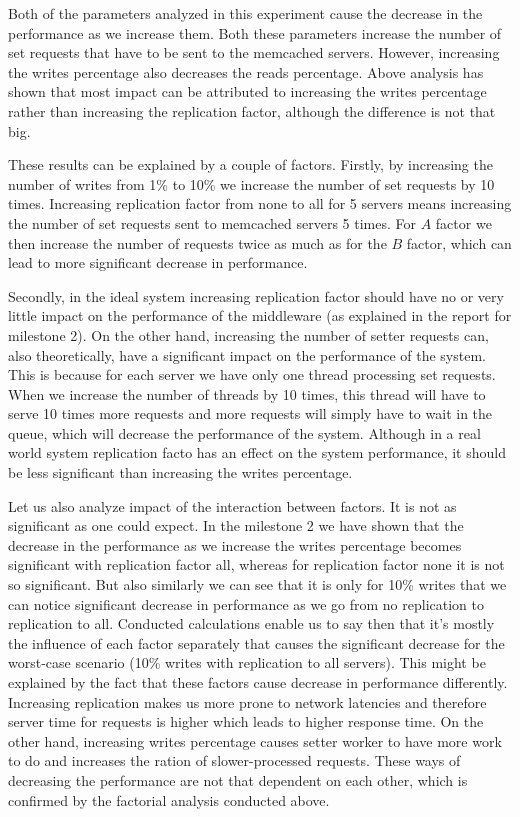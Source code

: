 \documentclass[11pt]{article}
\begin{document}
Both of the parameters analyzed in this experiment cause the decrease in the performance as we increase them. Both these parameters increase the number of set requests that have to be sent to the memcached servers. However, increasing the writes percentage also decreases the reads percentage. Above analysis has shown that most impact can be attributed to increasing the writes percentage rather than increasing the replication factor, although the difference is not that big.

These results can be explained by a couple of factors. Firstly, by increasing the number of writes from 1\% to 10\% we increase the number of set requests by 10 times. Increasing replication factor from none to all for 5 servers means increasing the number of set requests sent to memcached servers 5 times. For $A$ factor we then increase the number of requests twice as much as for the $B$ factor, which can lead to more significant decrease in performance.

Secondly, in the ideal system increasing replication factor should have no or very little impact on the performance of the middleware (as explained in the report for milestone 2). On the other hand, increasing the number of setter requests can, also theoretically, have a significant impact on the performance of the system. This is because for each server we have only one thread processing set requests. When we increase the number of threads by 10 times, this thread will have to serve 10 times more requests and more requests will simply have to wait in the queue, which will decrease the performance of the system. Although in a real world system replication facto has an effect on the system performance, it should be less significant than increasing the writes percentage. 

Let us also analyze impact of the interaction between factors. It is not as significant as one could expect. In the milestone 2 we have shown that the decrease in the performance as we increase the writes percentage becomes significant with replication factor all, whereas for replication factor none it is not so significant. But also similarly we can see that it is only for 10\% writes that we can notice significant decrease in performance as we go from no replication to replication to all. Conducted calculations enable us to say then that it's mostly the influence of each factor separately that causes the significant decrease for the worst-case scenario (10\% writes with replication to all servers). This might be explained by the fact that these factors cause decrease in performance differently. Increasing replication makes us more prone to network latencies and therefore server time for requests is higher which leads to higher response time. On the other hand, increasing writes percentage causes setter worker to have more work to do and increases the ration of slower-processed requests. These ways of decreasing the performance are not that dependent on each other, which is confirmed by the factorial analysis conducted above.
\end{document}
